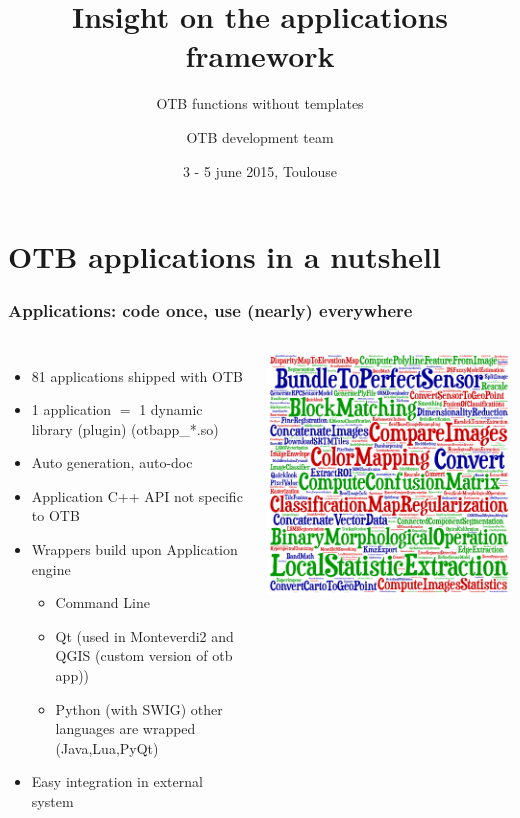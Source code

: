 \documentclass[8pt]{beamer}
\title{ Insight on the applications framework}
\subtitle{OTB functions without templates}
\author{OTB development team}%
\date{3 - 5 june 2015, Toulouse}
\begin{document}
\begin{frame}
\titlepage
\end{frame}

\section{OTB applications in a nutshell}

\begin{frame}
\frametitle{Applications: code once, use (nearly) everywhere}
\begin{columns}
\begin{itemize}
\item 81 applications shipped with OTB
\item 1 application $=$ 1 dynamic library (plugin) (otbapp\_*.so)
\item Auto generation, auto-doc
\item Application C++ API not specific to OTB
\item Wrappers build upon Application engine
\begin{itemize}
\item Command Line
\item Qt (used in Monteverdi2 and QGIS (custom version of otb app))
\item Python (with SWIG) other languages are wrapped (Java,Lua,PyQt) 
\end{itemize}
\item Easy integration in external system 
\end{itemize}
\includegraphics[width=\textwidth]{images/cloud_applications.png}
\end{columns}
\end{frame}
\end{document}
